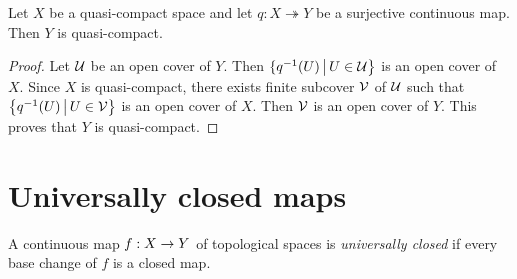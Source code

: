 \begin{proposition}\label{proposition:quasi-compact_spaces_are_preserved_by_continuous_images}
	Let $X$ be a quasi-compact space and let $q:X\twoheadrightarrow Y$ be a surjective continuous map. Then $Y$ is quasi-compact.
\end{proposition}
\begin{proof}
	Let ${\mathcal U}$ be an open cover of $Y$. Then $\{q^{-1}(U)\,\big|\,U \in {\mathcal U}\big\}$ is an open cover of $X$. Since $X$ is quasi-compact, there exists finite subcover ${\mathcal V}$ of ${\mathcal U}$ such that $\big\{q^{-1}(U)\,\big|\,U\in {\mathcal V}\big\}$ is an open cover of $X$. Then ${\mathcal V}$ is an open cover of $Y$. This proves that $Y$ is quasi-compact.
\end{proof}

\section{Universally closed maps}

\begin{definition}
	A continuous map $f:X\rightarrow Y$ of topological spaces is \textit{universally closed} if every base change of $f$ is a closed map.
\end{definition}


